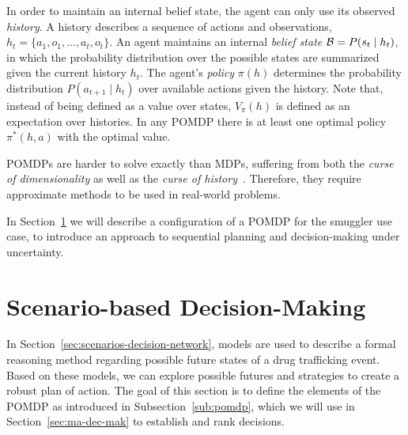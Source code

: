 \documentclass[conference]{IEEEtran}
\begin{document}
In order to maintain an internal belief state, the agent can only use its observed \emph{history}. A history describes a sequence of actions and observations, $h_t = \{a_1, o_1, \ldots, a_t, o_t\}$. An agent maintains an internal {\it belief state} ${\mathcal{B}} = P(s_t\mid  h_t)$, in which the probability distribution over the possible states are summarized given the current history $h_t$. The agent's \emph{policy} $\pi(h)$ determines the probability distribution $P(a_{t+1}\mid h_t)$ over available actions given the history. Note that, instead of being defined as a value over states, $V_{\pi}(h)$ is defined as an expectation over histories. In any POMDP there is at least one optimal policy $\pi^*(h,a)$ with the optimal value.

POMDPs are harder to solve exactly than MDPs, suffering from both the {\it curse of dimensionality} as well as the {\it curse of history}~\cite{pineau2006anytime}. Therefore, they require approximate methods to be used in real-world problems.

In Section~\ref{sec:scenario-based-dm} we will describe a configuration of a POMDP for the smuggler use case, to introduce an approach to sequential planning and decision-making under uncertainty. 



\section{Scenario-based Decision-Making}
\label{sec:scenario-based-dm}

In Section~\ref{sec:scenarios-decision-network}, models are used to describe a formal reasoning method regarding possible future states of a drug trafficking event. Based on these models, we can explore possible futures and strategies to create a robust plan of action. The goal of this section is to define the elements of the POMDP as introduced in Subsection~\ref{sub:pomdp}, which we will use in Section~\ref{sec:ma-dec-mak} to establish and rank decisions.
\end{document}
